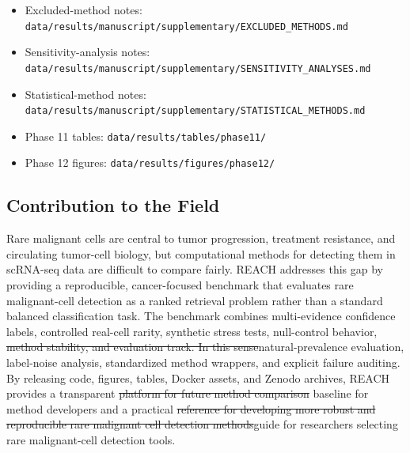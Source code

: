 \documentclass[10pt]{article}
\providecommand{\DIFaddtex}[1]{{\protect\color{trackgreen}#1}} %
\providecommand{\DIFdeltex}[1]{{\protect\color{red}\sout{#1}}}                      %
\providecommand{\DIFaddbegin}{} %
\providecommand{\DIFaddend}{} %
\providecommand{\DIFdelbegin}{} %
\providecommand{\DIFdelend}{} %
\providecommand{\DIFadd}[1]{\texorpdfstring{\DIFaddtex{#1}}{#1}} %
\providecommand{\DIFdel}[1]{\texorpdfstring{\DIFdeltex{#1}}{}} %
\newcommand{\DIFscaledelfig}{0.5}
\newlength{\DIFdelgraphicswidth} %
\newlength{\DIFdelgraphicsheight} %
\newcommand{\DIFaddincludegraphics}[2][]{{\color{trackgreen}\fbox{\DIFOincludegraphics[#1]{#2}}}} %
\newcommand{\DIFdelincludegraphics}[2][]{%
\sbox{\DIFdelgraphicsbox}{\DIFOincludegraphics[#1]{#2}}%
\settoboxwidth{\DIFdelgraphicswidth}{\DIFdelgraphicsbox} %
\settoboxtotalheight{\DIFdelgraphicsheight}{\DIFdelgraphicsbox} %
\scalebox{\DIFscaledelfig}{%
\parbox[b]{\DIFdelgraphicswidth}{\usebox{\DIFdelgraphicsbox}\\[-\baselineskip] \rule{\DIFdelgraphicswidth}{0em}}\llap{\resizebox{\DIFdelgraphicswidth}{\DIFdelgraphicsheight}{%
\setlength{\unitlength}{\DIFdelgraphicswidth}%
\begin{picture}(1,1)%
\thicklines\linethickness{2pt} %
{\color[rgb]{1,0,0}\put(0,0){\framebox(1,1){}}}%
{\color[rgb]{1,0,0}\put(0,0){\line( 1,1){1}}}%
{\color[rgb]{1,0,0}\put(0,1){\line(1,-1){1}}}%
\end{picture}%
}\hspace*{3pt}}} %
} %
\DeclareRobustCommand{\DIFaddbegin}{\DIFOaddbegin \let\includegraphics\DIFaddincludegraphics} %
\DeclareRobustCommand{\DIFaddend}{\DIFOaddend \let\includegraphics\DIFOincludegraphics} %
\DeclareRobustCommand{\DIFdelbegin}{\DIFOdelbegin \let\includegraphics\DIFdelincludegraphics} %
\DeclareRobustCommand{\DIFdelend}{\DIFOaddend \let\includegraphics\DIFOincludegraphics} %
\providecommand{\tightlist}{\setlength{\itemsep}{0pt}\setlength{\parskip}{0pt}}
\begin{document}
\begin{itemize}
\tightlist
\item
  \DIFadd{Excluded-method notes:
  }\texttt{\DIFadd{data/results/manuscript/supplementary/EXCLUDED\_METHODS.md}}
\item
  \DIFadd{Sensitivity-analysis notes:
  }\texttt{\DIFadd{data/results/manuscript/supplementary/SENSITIVITY\_ANALYSES.md}}
\item
  \DIFadd{Statistical-method notes:
  }\texttt{\DIFadd{data/results/manuscript/supplementary/STATISTICAL\_METHODS.md}}
\item
  \DIFadd{Phase 11 tables: }\texttt{\DIFadd{data/results/tables/phase11/}}
\item
  \DIFadd{Phase 12 figures: }\texttt{\DIFadd{data/results/figures/phase12/}}
\end{itemize}

\begin{center}\DIFadd{\rule{0.5\linewidth}{0.5pt}}\end{center}

\subsection{\DIFadd{Contribution to the Field}}\label{contribution-to-the-field}

\DIFadd{Rare malignant cells are central to tumor progression, treatment
resistance, and circulating tumor-cell biology, but computational
methods for detecting them in scRNA-seq data are difficult to compare
fairly. REACH addresses this gap by providing a reproducible,
cancer-focused benchmark that evaluates rare malignant-cell detection as
a ranked retrieval problem rather than a standard balanced
classification task. The benchmark combines multi-evidence confidence
labels, controlled real-cell rarity, synthetic stress tests,
null-control }\DIFaddend behavior, \DIFdelbegin \DIFdel{method stability, and evaluation track.
In this sense}\DIFdelend \DIFaddbegin \DIFadd{natural-prevalence evaluation, label-noise
analysis, standardized method wrappers, and explicit failure auditing.
By releasing code, figures, tables, Docker assets, and Zenodo archives}\DIFaddend ,
REACH provides a transparent \DIFdelbegin \DIFdel{platform for future method comparison }\DIFdelend \DIFaddbegin \DIFadd{baseline for method developers }\DIFaddend and a
practical \DIFdelbegin \DIFdel{reference for developing more robust and reproducible rare malignant cell detection
methods}\DIFdelend \DIFaddbegin \DIFadd{guide for researchers selecting rare malignant-cell detection
tools}\DIFaddend .
\end{document}
